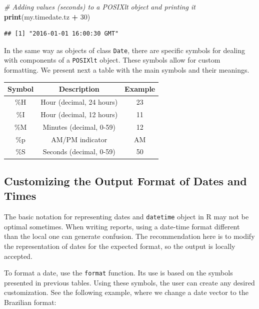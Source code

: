 \documentclass[11pt,]{book}
\newenvironment{Shaded}{\begin{snugshade}}{\end{snugshade}}
\newcommand{\KeywordTok}[1]{\textcolor[rgb]{0.27,0.27,0.27}{\textbf{#1}}}
\newcommand{\DecValTok}[1]{\textcolor[rgb]{0.06,0.06,0.06}{#1}}
\newcommand{\StringTok}[1]{\textcolor[rgb]{0.5,0.5,0.5}{#1}}
\newcommand{\CommentTok}[1]{\textcolor[rgb]{0.56,0.35,0.01}{\textit{#1}}}
\newcommand{\OperatorTok}[1]{\textcolor[rgb]{0.81,0.36,0.00}{\textbf{#1}}}
\newcommand{\NormalTok}[1]{#1}
\begin{document}
\begin{Shaded}
\begin{Highlighting}[]
\CommentTok{# Adding values (seconds) to a POSIXlt object and printing it}
\KeywordTok{print}\NormalTok{(my.timedate.tz }\OperatorTok{+}\StringTok{ }\DecValTok{30}\NormalTok{)}
\end{Highlighting}
\end{Shaded}

\begin{verbatim}
## [1] "2016-01-01 16:00:30 GMT"
\end{verbatim}

In the same way as objects of class \texttt{Date}, there are specific
symbols for dealing with components of a \texttt{POSIXlt} object. These
symbols allow for custom formatting. We present next a table with the
main symbols and their meanings.

\begin{longtable}[]{@{}ccc@{}}
\toprule
Symbol & Description & Example\tabularnewline
\midrule
\endhead
\%H & Hour (decimal, 24 hours) & 23\tabularnewline
\%I & Hour (decimal, 12 hours) & 11\tabularnewline
\%M & Minutes (decimal, 0-59) & 12\tabularnewline
\%p & AM/PM indicator & AM\tabularnewline
\%S & Seconds (decimal, 0-59) & 50\tabularnewline
\bottomrule
\end{longtable}

\subsection{Customizing the Output Format of Dates and
Times}\label{customizing-the-output-format-of-dates-and-times}

The basic notation for representing dates and \texttt{datetime} object
in R may not be optimal sometimes. When writing reports, using a
date-time format different than the local one can generate confusion.
The recommendation here is to modify the representation of dates for the
expected format, so the output is locally accepted.

To format a date, use the \texttt{format} function. Its use is based on
the symbols presented in previous tables. Using these symbols, the user
can create any desired customization. See the following example, where
we change a date vector to the Brazilian format: 
\end{document}
